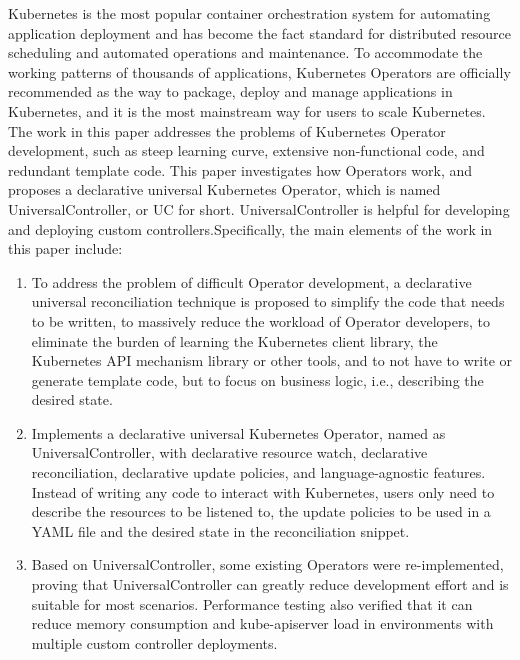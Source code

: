 \documentclass[macfonts,master]{njuthesis}
\begin{document}
\begin{englishabstract}
Kubernetes is the most popular container orchestration system for automating application deployment and has become the fact standard for distributed resource scheduling and automated operations and maintenance. To accommodate the working patterns of thousands of applications, Kubernetes Operators are officially recommended as the way to package, deploy and manage applications in Kubernetes, and it is the most mainstream way for users to scale Kubernetes. The work in this paper addresses the problems of Kubernetes Operator development, such as steep learning curve, extensive non-functional code, and redundant template code. This paper investigates how Operators work, and proposes a declarative universal Kubernetes Operator, which is named UniversalController, or UC for short. UniversalController is helpful for developing and deploying custom controllers.Specifically, the main elements of the work in this paper include:

\begin{enumerate}
	\item To address the problem of difficult Operator development, a declarative universal reconciliation technique is proposed to simplify the code that needs to be written, to massively reduce the workload of Operator developers, to eliminate the burden of learning the Kubernetes client library, the Kubernetes API mechanism library or other tools, and to not have to write or generate template code, but to focus on business logic, i.e., describing the desired state.
	\item Implements a declarative universal Kubernetes Operator, named as UniversalController, with declarative resource watch, declarative reconciliation, declarative update policies, and language-agnostic features. Instead of writing any code to interact with Kubernetes, users only need to describe the resources to be listened to, the update policies to be used in a YAML file and the desired state in the reconciliation snippet.
	\item Based on UniversalController, some existing Operators were re-implemented, proving that UniversalController can greatly reduce development effort and is suitable for most scenarios. Performance testing also verified that it can reduce memory consumption and kube-apiserver load in environments with multiple custom controller deployments.
\end{enumerate}

\end{englishabstract}
\end{document}
